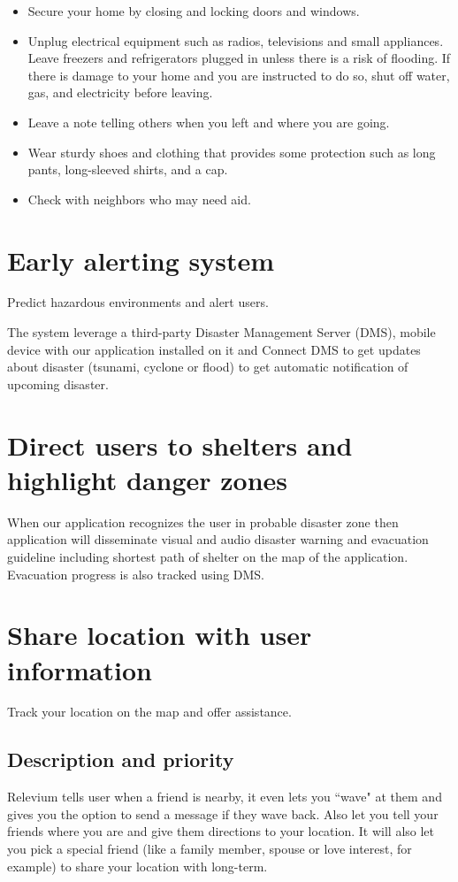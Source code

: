 \documentclass{scrreprt}
\begin{document}
\begin{itemize}
\item Secure your home by closing and locking doors and windows.
\item Unplug electrical equipment such as radios, televisions and small appliances. Leave freezers and refrigerators plugged in unless there is a risk of flooding. If there is damage to your home and you are instructed to do so, shut off water, gas, and electricity before leaving.
\item Leave a note telling others when you left and where you are going.
\item Wear sturdy shoes and clothing that provides some protection such as long pants, long-sleeved shirts, and a cap.
\item Check with neighbors who may need aid.
\end{itemize}

\newpage
\section{Early alerting system}
Predict hazardous environments and alert users.

The system leverage a third-party Disaster Management Server (DMS), mobile device with our application installed on it and Connect DMS to get updates about disaster (tsunami, cyclone or flood) to get automatic notification of upcoming disaster.


\section{Direct users to shelters and highlight danger zones}


When our application recognizes the user in probable disaster zone then application will disseminate visual and audio disaster warning and evacuation guideline including shortest path of shelter on the map of the application. Evacuation progress is also tracked using DMS.



\section{Share location with user information}
Track your location on the map and offer assistance.


\subsection{Description and priority}
Relevium tells user when a friend is nearby, it even lets you ``wave" at them and gives you the option to send a message if they wave back. Also let you tell your friends where you are and give them directions to your location. It will also let you pick a special friend (like a family member, spouse or love interest, for example) to share your location with long-term.
\end{document}
